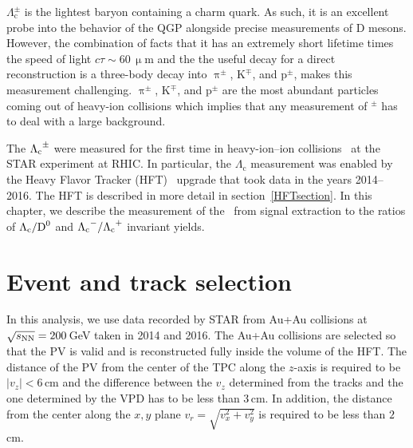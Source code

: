         $\Lambda_\mathrm{c}^\pm$ is the lightest baryon containing a charm quark. As such, it is an excellent probe into the behavior of the QGP alongside precise measurements of D mesons. However, the combination of facts that it has an extremely short lifetime times the speed of light $c\tau \sim 60\,\upmu$m and the the useful decay for a direct reconstruction is a three-body decay into $\uppi^\pm$, K$^\mp$, and p$^\pm$, makes this measurement challenging. $\uppi^\pm$, K$^\mp$, and p$^\pm$ are the most abundant particles coming out of heavy-ion collisions which implies that any measurement of \Lambdac$^\pm$ has to deal with a large background.

The ${\Lambda_\text{c}}^\pm$ were measured for the first time in heavy-ion--ion collisions~\cite{GuannanLc} at the STAR experiment at RHIC\@. In particular, the $\Lambda_\mathrm{c}$ measurement was enabled by the Heavy Flavor Tracker (HFT)~\cite{Kapitan} upgrade that took data in the years 2014--2016\@. The HFT is described in more detail in section~\ref{HFTsection}\@. In this chapter, we describe the measurement of the \Lambdac\ from signal extraction to the ratios of ${\Lambda_\text{c}}/{\text{D}^0}$ and ${\Lambda_\text{c}}^-/{\Lambda_\text{c}}^+$ invariant yields. 



\section{\label{eventAndTrackSelection}Event and track selection}
In this analysis, we use data recorded by STAR from Au+Au collisions at $\sqrt{s_\text{NN}} = 200\,$GeV taken in 2014 and 2016. The Au+Au collisions are selected so that the PV is valid and is reconstructed fully inside the volume of the HFT\@. The distance of the PV from the center of the TPC along the $z$-axis is required to be $|v_z| < 6\,$cm and the difference between the $v_z$ determined from the tracks and the one determined by the VPD has to be less than 3$\,$cm. In addition, the distance from the center along the $x,y$ plane $v_r = \sqrt{v_x^2 + v_y^2}$ is required to be less than $2\,$cm.

